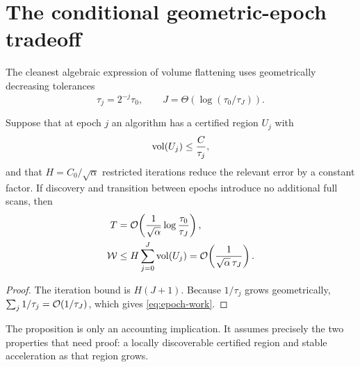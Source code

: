 \section{The conditional geometric-epoch tradeoff}
\label{sec:epoch-blueprint}

The cleanest algebraic expression of volume flattening uses geometrically
decreasing tolerances
\begin{equation}
  \tau_j=2^{-j}\tau_0,
  \qquad J=\Theta(\log(\tau_0/\tau_J)).
  \label{eq:geometric-tolerances}
\end{equation}

\begin{proposition}
\label{prop:conditional-epochs}
Suppose that at epoch $j$ an algorithm has a certified region $U_j$ with
\begin{equation}
  \operatorname{vol}(U_j)\leq\frac{C}{\tau_j},
  \label{eq:epoch-volume}
\end{equation}
and that $H=C_0/\sqrt\alpha$ restricted iterations reduce the relevant error
by a constant factor.  If discovery and transition between epochs introduce
no additional full scans, then
\begin{align}
 T&=\mathcal{O}\!\left(\frac1{\sqrt\alpha}
                  \log\frac{\tau_0}{\tau_J}\right),
 \label{eq:epoch-iterations}\\
 \mathcal W
 &\leq H\sum_{j=0}^{J}\operatorname{vol}(U_j)
 =\mathcal{O}\!\left(\frac1{\sqrt\alpha\,\tau_J}\right).
 \label{eq:epoch-work}
\end{align}
\end{proposition}

\begin{proof}
The iteration bound is $H(J+1)$.  Because $1/\tau_j$ grows geometrically,
$\sum_j1/\tau_j=\mathcal{O}(1/\tau_J)$, which gives \cref{eq:epoch-work}.
\end{proof}

The proposition is only an accounting implication.  It assumes precisely the
two properties that need proof: a locally discoverable certified region and
stable acceleration as that region grows.
